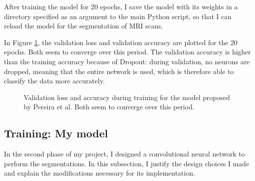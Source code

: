 \documentclass[12pt,a4paper,twoside,openright]{report}
\newlength\figureheight
\newlength\figurewidth
\begin{document}
After training the model for 20 epochs, I save the model with its weights in a directory specified as an argument to the main Python script, so that I can reload the model for the segmentation of MRI scans. 

In Figure \ref{fig:pereira_validation_loss}, the validation loss and validation accuracy are plotted for the 20 epochs. Both seem to converge over this period. The validation accuracy is higher than the training accuracy because of Dropout: during validation, no neurons are dropped, meaning that the entire network is used, which is therefore able to classify the data more accurately.

\begin{figure}
	\centering
	\setlength\figureheight{10cm}
	\setlength{}
	
	\caption[Validation loss and accuracy during training for the model proposed by Pereira et al.]{Validation loss and accuracy during training for the model proposed by Pereira et al. Both seem to converge over this period.}
	\label{fig:pereira_validation_loss}
\end{figure}

\subsection{Training: My model}
In the second phase of my project, I designed a convolutional neural network to perform the segmentations. In this subsection, I justify the design choices I made and explain the modifications necessary for its implementation.
\end{document}
